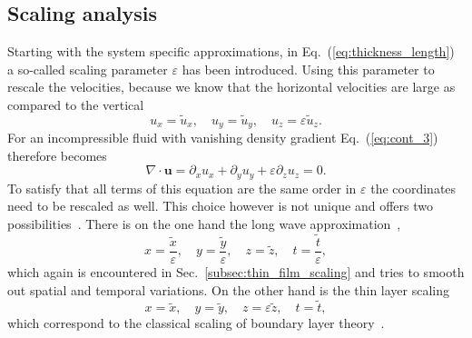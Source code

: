 \subsection{Scaling analysis}
\label{subssec:scaling_shallow water}
Starting with the system specific approximations, in Eq.~(\ref{eq:thickness_length}) a so-called scaling parameter $\varepsilon$ has been introduced. 
Using this parameter to rescale the velocities, because we know that the horizontal velocities are large as compared to the vertical
\begin{equation}\label{eq:vel_scaling}
    u_x = \tilde{u}_x,\quad u_y = \tilde{u}_y,\quad u_z = \varepsilon\tilde{u}_z.
\end{equation}
For an incompressible fluid with vanishing density gradient Eq.~(\ref{eq:cont_3}) therefore becomes
\begin{equation}\label{eq:cont_nondim}
    \nabla\cdot\mathbf{u} = \partial_x u_x + \partial_y u_y + \varepsilon\partial_z u_z = 0.
\end{equation}
To satisfy that all terms of this equation are the same order in $\varepsilon$ the coordinates need to be rescaled as well. 
This choice however is not unique and offers two possibilities~\cite{james2019towards}.
There is on the one hand the long wave approximation~\cite{RevModPhys.69.931},
\begin{equation}\label{eq:long_wave_scaling}
    x = \frac{\tilde{x}}{\varepsilon},\quad y = \frac{\tilde{y}}{\varepsilon},\quad z = \tilde{z},\quad t = \frac{\tilde{t}}{\varepsilon},
\end{equation}
which again is encountered in Sec.~\ref{subsec:thin_film_scaling} and tries to smooth out spatial and temporal variations.
On the other hand is the thin layer scaling
\begin{equation}\label{eq:scaling_thin_layer}
    x = \tilde{x},\quad y = \tilde{y},\quad z = \varepsilon\tilde{z},\quad t = \tilde{t},
\end{equation}
which correspond to the classical scaling of boundary layer theory~\cite{milne1996theoretical}.

